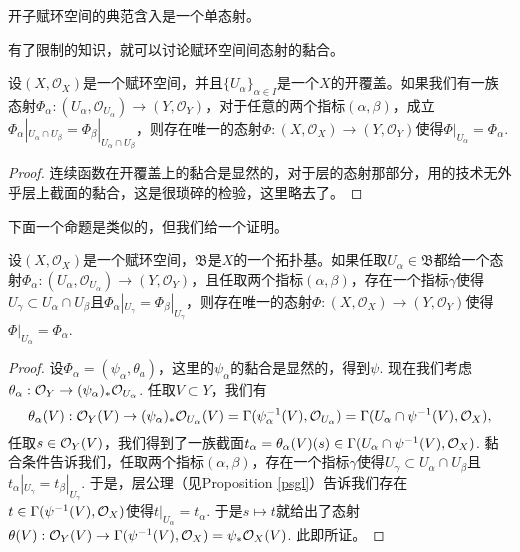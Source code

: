 \begin{coro}\label{coro:1.21}
开子赋环空间的典范含入是一个单态射。
\end{coro}

有了限制的知识，就可以讨论赋环空间间态射的黏合。

\begin{pro}
设$(X,\mathcal{O}_X)$是一个赋环空间，并且$\{U_\alpha\}_{\alpha\in I}$是一个$X$的开覆盖。如果我们有一族态射$\Phi_\alpha:(U_{\alpha},\mathcal{O}_{U_{\alpha}})\to (Y,\mathcal{O}_Y)$，对于任意的两个指标$(\alpha,\beta)$，成立$\Phi_\alpha|_{U_{\alpha}\cap U_{\beta}}=\Phi_\beta|_{U_{\alpha}\cap U_{\beta}}$，则存在唯一的态射$\Phi:(X,\mathcal{O}_{X})\to (Y,\mathcal{O}_Y)$使得$\Phi|_{U_{\alpha}}=\Phi_\alpha$.
\end{pro}

\begin{proof} 连续函数在开覆盖上的黏合是显然的，对于层的态射那部分，用的技术无外乎层上截面的黏合，这是很琐碎的检验，这里略去了。\end{proof}

下面一个命题是类似的，但我们给一个证明。

\begin{pro}\label{rsnh}
设$(X,\mathcal{O}_X)$是一个赋环空间，$\mathfrak{B}$是$X$的一个拓扑基。如果任取$U_\alpha\in \mathfrak{B}$都给一个态射$\Phi_\alpha:(U_{\alpha},\mathcal{O}_{U_{\alpha}})\to (Y,\mathcal{O}_Y)$，且任取两个指标$(\alpha,\beta)$，存在一个指标$\gamma$使得$U_\gamma\subset U_\alpha\cap U_\beta$且$\Phi_\alpha|_{U_\gamma}=\Phi_\beta|_{U_\gamma}$，则存在唯一的态射$\Phi:(X,\mathcal{O}_{X})\to (Y,\mathcal{O}_Y)$使得$\Phi|_{U_{\alpha}}=\Phi_\alpha$.
\end{pro}

\begin{proof}
设$\Phi_\alpha=(\psi_\alpha,\theta_a)$，这里的$\psi_\alpha$的黏合是显然的，得到$\psi$. 现在我们考虑$\theta_\alpha:\mathcal{O}_Y\to (\psi_\alpha)_*\mathcal{O}_{U_\alpha}$. 任取$V\subset Y$，我们有
\[
	\theta_\alpha(V):\mathcal{O}_Y(V)\to (\psi_\alpha)_*\mathcal{O}_{U_\alpha}(V)=\Gamma(\psi_\alpha^{-1}(V),\mathcal{O}_{U_\alpha})=\Gamma(U_\alpha\cap\psi^{-1}(V),\mathcal{O}_{X}),
\]
任取$s\in \mathcal{O}_Y(V)$，我们得到了一族截面$t_\alpha=\theta_\alpha(V)(s)\in\Gamma(U_\alpha\cap\psi^{-1}(V),\mathcal{O}_{X})$. 黏合条件告诉我们，任取两个指标$(\alpha,\beta)$，存在一个指标$\gamma$使得$U_\gamma\subset U_\alpha\cap U_\beta$且$t_\alpha|_{U_\gamma}=t_\beta|_{U_\gamma}$. 于是，层公理（见Proposition \ref{psgl}）告诉我们存在$t\in\Gamma(\psi^{-1}(V),\mathcal{O}_{X})$使得$t|_{U_\alpha}=t_\alpha$. 于是$s\mapsto t$就给出了态射$\theta(V):\mathcal{O}_Y(V)\to \Gamma(\psi^{-1}(V),\mathcal{O}_{X})=\psi_*\mathcal{O}_X(V)$. 此即所证。
\end{proof}

